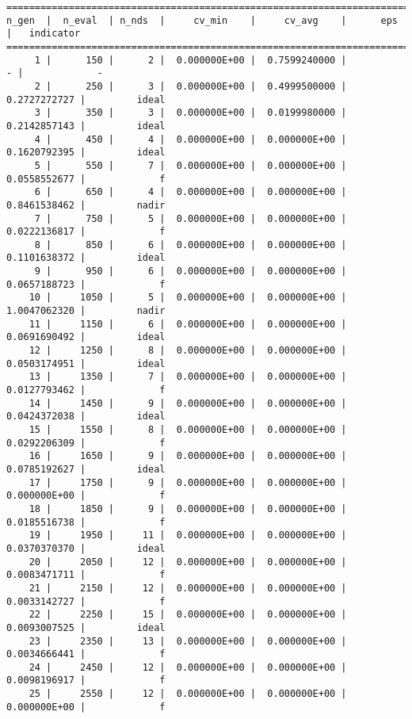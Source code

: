 \documentclass[
  authoryear,
  preprint,
  3p]{elsarticle}
\begin{document}
\begin{verbatim}
==========================================================================================
n_gen  |  n_eval  | n_nds  |     cv_min    |     cv_avg    |      eps      |   indicator  
==========================================================================================
     1 |      150 |      2 |  0.000000E+00 |  0.7599240000 |             - |             -
     2 |      250 |      3 |  0.000000E+00 |  0.4999500000 |  0.2727272727 |         ideal
     3 |      350 |      3 |  0.000000E+00 |  0.0199980000 |  0.2142857143 |         ideal
     4 |      450 |      4 |  0.000000E+00 |  0.000000E+00 |  0.1620792395 |         ideal
     5 |      550 |      7 |  0.000000E+00 |  0.000000E+00 |  0.0558552677 |             f
     6 |      650 |      4 |  0.000000E+00 |  0.000000E+00 |  0.8461538462 |         nadir
     7 |      750 |      5 |  0.000000E+00 |  0.000000E+00 |  0.0222136817 |             f
     8 |      850 |      6 |  0.000000E+00 |  0.000000E+00 |  0.1101638372 |         ideal
     9 |      950 |      6 |  0.000000E+00 |  0.000000E+00 |  0.0657188723 |             f
    10 |     1050 |      5 |  0.000000E+00 |  0.000000E+00 |  1.0047062320 |         nadir
    11 |     1150 |      6 |  0.000000E+00 |  0.000000E+00 |  0.0691690492 |         ideal
    12 |     1250 |      8 |  0.000000E+00 |  0.000000E+00 |  0.0503174951 |         ideal
    13 |     1350 |      7 |  0.000000E+00 |  0.000000E+00 |  0.0127793462 |             f
    14 |     1450 |      9 |  0.000000E+00 |  0.000000E+00 |  0.0424372038 |         ideal
    15 |     1550 |      8 |  0.000000E+00 |  0.000000E+00 |  0.0292206309 |             f
    16 |     1650 |      9 |  0.000000E+00 |  0.000000E+00 |  0.0785192627 |         ideal
    17 |     1750 |      9 |  0.000000E+00 |  0.000000E+00 |  0.000000E+00 |             f
    18 |     1850 |      9 |  0.000000E+00 |  0.000000E+00 |  0.0185516738 |             f
    19 |     1950 |     11 |  0.000000E+00 |  0.000000E+00 |  0.0370370370 |         ideal
    20 |     2050 |     12 |  0.000000E+00 |  0.000000E+00 |  0.0083471711 |             f
    21 |     2150 |     12 |  0.000000E+00 |  0.000000E+00 |  0.0033142727 |             f
    22 |     2250 |     15 |  0.000000E+00 |  0.000000E+00 |  0.0093007525 |         ideal
    23 |     2350 |     13 |  0.000000E+00 |  0.000000E+00 |  0.0034666441 |             f
    24 |     2450 |     12 |  0.000000E+00 |  0.000000E+00 |  0.0098196917 |             f
    25 |     2550 |     12 |  0.000000E+00 |  0.000000E+00 |  0.000000E+00 |             f

\end{verbatim}
\end{document}
